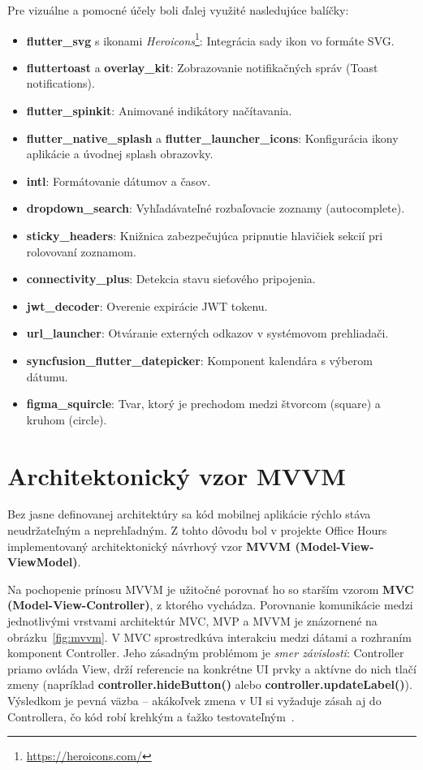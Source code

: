 Pre vizuálne a pomocné účely boli ďalej využité nasledujúce balíčky: 
\begin{itemize}
    \item \textbf{flutter\_svg} s ikonami \textit{Heroicons}\footnote{\url{https://heroicons.com/}}: Integrácia sady ikon vo formáte SVG.
    \item \textbf{fluttertoast} a \textbf{overlay\_kit}: Zobrazovanie notifikačných správ (Toast notifications).
    \item \textbf{flutter\_spinkit}: Animované indikátory načítavania.
    \item \textbf{flutter\_native\_splash} a \textbf{flutter\_launcher\_icons}: Konfigurácia ikony aplikácie a úvodnej splash obrazovky.
    \item \textbf{intl}: Formátovanie dátumov a časov.
    \item \textbf{dropdown\_search}: Vyhľadávateľné rozbaľovacie zoznamy (autocomplete).
    \item \textbf{sticky\_headers}: Knižnica zabezpečujúca pripnutie hlavičiek sekcií pri rolovovaní zoznamom.
    \item \textbf{connectivity\_plus}: Detekcia stavu sieťového pripojenia.
    \item \textbf{jwt\_decoder}: Overenie expirácie JWT tokenu.
    \item \textbf{url\_launcher}: Otváranie externých odkazov v systémovom prehliadači.
    \item \textbf{syncfusion\_flutter\_datepicker}: Komponent kalendára s výberom dátumu.
    \item \textbf{figma\_squircle}: Tvar, ktorý je prechodom medzi štvorcom (square) a kruhom (circle).
\end{itemize}

\section{Architektonický vzor MVVM}
\label{sec:architektura-mvvm}
Bez jasne definovanej architektúry sa kód mobilnej aplikácie rýchlo stáva neudržateľným a neprehľadným. Z tohto dôvodu bol v projekte Office Hours implementovaný architektonický návrhový vzor \textbf{MVVM (Model-View-ViewModel)}.

Na pochopenie prínosu MVVM je užitočné porovnať ho so starším vzorom \textbf{MVC (Model-View-Controller)}, z ktorého vychádza. Porovnanie komunikácie medzi jednotlivými vrstvami architektúr MVC, MVP a MVVM je znázornené na obrázku~\ref{fig:mvvm}. V MVC sprostredkúva interakciu medzi dátami a rozhraním komponent Controller. Jeho zásadným problémom je \textit{smer závislosti}: Controller priamo ovláda View, drží referencie na konkrétne UI prvky a aktívne do nich tlačí zmeny (napríklad \textbf{controller.hideButton()} alebo \textbf{controller.updateLabel()}). Výsledkom je pevná väzba – akákoľvek zmena v UI si vyžaduje zásah aj do Controllera, čo kód robí krehkým a ťažko testovateľným~\cite{akhtar2021}.

